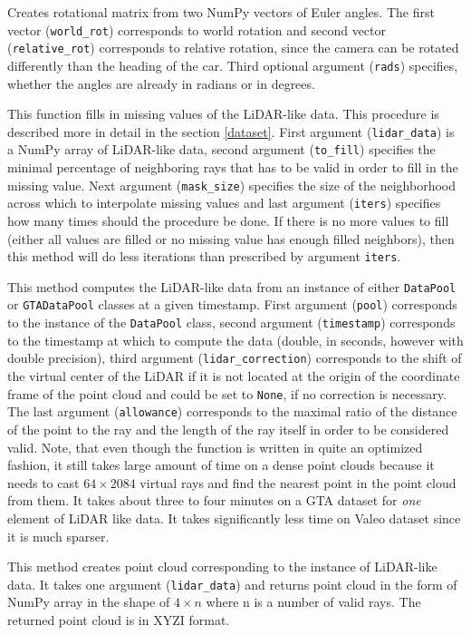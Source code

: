 \begin{description}
 Creates rotational matrix from two NumPy vectors of Euler angles. The first vector (\texttt{world\_rot}) corresponds to world rotation and second vector (\texttt{relative\_rot}) corresponds to relative rotation, since the camera can be rotated differently than the heading of the car. Third optional argument (\texttt{rads}) specifies, whether the angles are already in radians or in degrees.

 This function fills in missing values of the LiDAR-like data. This procedure is described more in detail in the section \ref{dataset}. First argument (\texttt{lidar\_data}) is a NumPy array of LiDAR-like data, second argument (\texttt{to\_fill}) specifies the minimal percentage of neighboring rays that has to be valid in order to fill in the missing value. Next argument (\texttt{mask\_size}) specifies the size of the neighborhood across which to interpolate missing values and last argument (\texttt{iters}) specifies how many times should the procedure be done. If there is no more values to fill (either all values are filled or no missing value has enough filled neighbors), then this method will do less iterations than prescribed by argument \texttt{iters}.

 This method computes the LiDAR-like data from an instance of either \texttt{DataPool} or \texttt{GTADataPool} classes at a given timestamp. First argument (\texttt{pool}) corresponds to the instance of the \texttt{DataPool} class, second argument (\texttt{timestamp}) corresponds to the timestamp at which to compute the data (double, in seconds, however with double precision), third argument (\texttt{lidar\_correction}) corresponds to the shift of the virtual center of the LiDAR if it is not located at the origin of the coordinate frame of the point cloud and could be set to \texttt{None}, if no correction is necessary. The last argument (\texttt{allowance}) corresponds to the maximal ratio of the distance of the point to the ray and the length of the ray itself in order to be considered valid. Note, that even though the function is written in quite an optimized fashion, it still takes large amount of time on a dense point clouds because it needs to cast $64\times2084$ virtual rays and find the nearest point in the point cloud from them. It takes about three to four minutes on a GTA dataset for {\em one} element of LiDAR like data. It takes significantly less time on Valeo dataset since it is much sparser.

 This method creates point cloud corresponding to the instance of LiDAR-like data. It takes one argument (\texttt{lidar\_data}) and returns point cloud in the form of NumPy array in the shape of $4\times n$ where n is a number of valid rays. The returned point cloud is in XYZI format.
\end{description}

